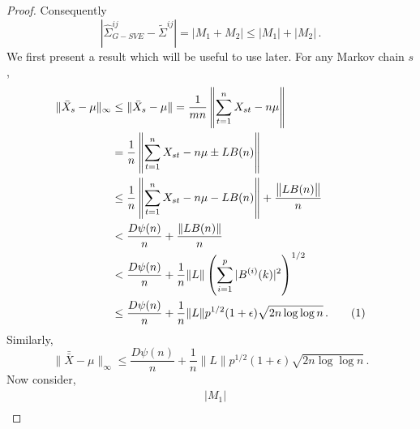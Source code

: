 \documentclass[11pt]{article}
\newcommand\numberthis{\addtocounter{equation}{1}\tag{\theequation}}
\theoremstyle{remark}
\begin{document}
\begin{proof}
Consequently
\[
\left|\hat{\Sigma}_{G-SVE}^{ij} - \tilde{\Sigma}^{ij}  \right| = |M_1 + M_2| \leq |M_1| + |M_2|\,.
\]
%
We first present a result which will be useful to use later. For any Markov chain $s$, 
\begin{align*}
  \|\bar{X}_s - \mu\|_{\infty} & \leq \|\bar{X}_s - \mu\| = \dfrac{1}{mn}\left\|\sum_{t=1}^{n}X_{st} - n\mu\right\| \\
  &= \dfrac{1}{n}  \left \|\sum_{t=1}^{n}X_{st} - n\mu \pm L B(n) \right\|\\
  & \leq \dfrac{1}{n}\left\|\sum_{t=1}^{n}X_{st} - n \mu - L B(n)\right\| + \dfrac{\left\|L B(n)\right\|}{n}\\
  &< \dfrac{D\psi(n)}{n} + \dfrac{\|L B(n)\|}{n}\\
  &< \dfrac{D\psi(n)}{n} + \dfrac{1}{n}\|L\| \left(\sum\limits_{i=1}^{p}|B^{(i)}(k)|^2\right)^{1/2}\\
  & \leq \dfrac{D\psi(n)}{n} + \dfrac{1}{n}\|L\| p^{1/2}(1+\epsilon)\sqrt{2n \log\log n}\,. \numberthis \label{eq:xbars_bound}
\end{align*}
 Similarly,
 \begin{equation}
\label{eq:xbarbar_bound}
   \| \bar{\bar{X}} - \mu\|_{\infty} \leq \dfrac{D\psi(n)}{n} + \dfrac{1}{n}\|L\| p^{1/2}(1+\epsilon)\sqrt{2n \log\log n}\,.
\end{equation}
%
Now consider,
\begin{align*}
& |M_1| \\ 

\end{align*}
\end{proof}
\end{document}

